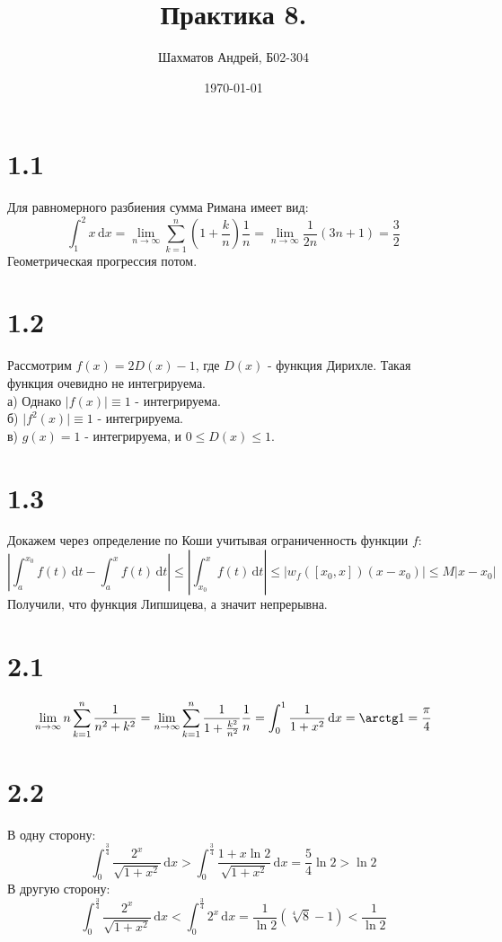 \documentclass[12pt]{article}
\title{Практика 8.}
\author{Шахматов Андрей, Б02-304}
\date{\today}
\begin{document}
\maketitle
\tableofcontents

\section{1.1}
Для равномерного разбиения сумма Римана имеет вид:
\[
    \int_{1}^{2} x \,\mathrm{d}x = \lim_{n \to \infty} \sum_{k=1}^{n} \left( 1 + \frac{k}{n} \right) \frac{1}{n} = 
    \lim_{n \to \infty} \frac{1}{2n} \left( 3n + 1 \right) = \frac{3}{2} 
\]
Геометрическая прогрессия потом. 
\section{1.2}
Рассмотрим $f(x) = 2D(x) - 1$, где $D(x)$ - функция Дирихле. Такая функция очевидно не интегрируема.  
\\а) Однако $\vert f(x) \vert \equiv 1$ - интегрируема. 
\\б) $\vert f^2(x) \vert \equiv 1$ - интегрируема. 
\\в) $g(x) = 1$ - интегрируема, и $0 \leq D(x) \leq 1$. 
\section{1.3}
Докажем через определение по Коши учитывая ограниченность функции $f$: 
\[
    \left\vert \int_{a}^{x_0} f(t) \,\mathrm{d}t - \int_{a}^{x} f(t) \,\mathrm{d}t \right\vert \leq 
    \left\vert \int_{x_0}^{x} f(t) \,\mathrm{d}t \right\vert \leq \left\vert  w_f([x_0, x])(x - x_0) \right\vert \leq 
    M \vert x - x_0 \vert 
\]    
Получили, что функция Липшицева, а значит непрерывна. 
\section{2.1}
\[
    \lim_{n \to \infty} n \sum_{k=1}^{n} \frac{1}{n^2 + k^2} = 
    \lim_{n \to \infty} \sum_{k=1}^{n} \frac{1}{1 + \frac{k^2}{n^2}} \frac{1}{n} = 
    \int_{0}^{1} \frac{1}{1 + x^2} \,\mathrm{d}x = \arctg 1 = \frac{\pi}{4} 
\]
\section{2.2}
В одну сторону:
\[
    \int_{0}^{\frac{3}{4}} \frac{2^x}{\sqrt{1 + x^2} } \,\mathrm{d}x > \int_{0}^{\frac{3}{4}} \frac{1 + x \ln 2}{\sqrt{1 + x^2}} \,\mathrm{d}x = \frac{5}{4} \ln 2 > \ln 2 
\]
В другую сторону: 
\[
    \int_{0}^{\frac{3}{4}} \frac{2^x}{\sqrt{1 + x^2} } \,\mathrm{d}x < \int_{0}^{\frac{3}{4}} 2^x \,\mathrm{d}x = \frac{1}{\ln 2} \left( \sqrt[4]{8} - 1 \right) < \frac{1}{\ln 2} 
\]
\end{document}
